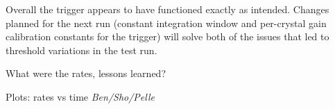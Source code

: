 Overall the trigger appears to have functioned exactly as intended. Changes planned for the next run (constant integration window and per-crystal gain calibration constants for the trigger) will solve both of the issues that led to threshold variations in the test run.

What were the rates, lessons learned?

Plots: rates vs time {\it Ben/Sho/Pelle}


